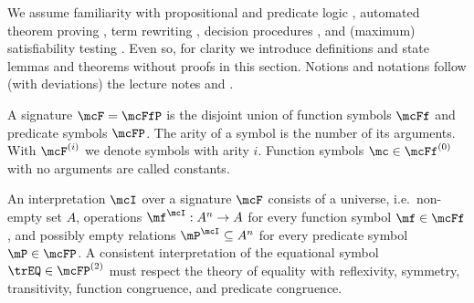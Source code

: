 %
We assume familiarity with propositional and predicate logic \cite{Huth:2004:LCS:975331}, 
automated theorem proving \cite{Fitting:1996:FLA:230183}, 
term rewriting \cite{Baader:1998:TR:280474}, 
decision procedures \cite{Kroening:2008:DPA:1391237}, 
and (maximum) satisfiability testing \cite{Biere:2009:HSV:1550723}.
Even so, for clarity we introduce
definitions and state lemmas and theorems without proofs in this section.
Notions and notations follow (with deviations) the lecture notes \cite{AM2015tr} and \cite{GM2013ar}.
\begin{definition}\label{def:signature}
A {\myem signature} $\mcF=\mcFfP$ is the disjoint union of {\myem function symbols} $\mcFf$
and {\myem predicate symbols} $\mcFP$.
The {\myem arity} of a symbol is the number of its arguments.
With $\mcF^{(i)}$ we denote symbols with arity $i$.
Function symbols $\mc\in\mcFf^{(0)}$ with no arguments are called {\myem constants}.
\end{definition}
\begin{definition}
An {\myem interpretation} $\mcI$ over a signature $\mcF$ consists 
of a {\myem universe}, i.e.~non-empty set  $A$,
operations $\mf^\mcI: A^n\rightarrow A$  for every function symbol $\mf\in\mcFf$, 
and possibly empty relations $\mP^\mcI\subseteq A^n$ for every predicate symbol $\mP\in\mcFP$.
A {\myem consistent interpretation} of the equational symbol ${\trEQ}\in\mcFP^{(2)}$ must respect the theory of equality
with reflexivity, symmetry, transitivity, function congruence, and predicate congruence.
\end{definition}
